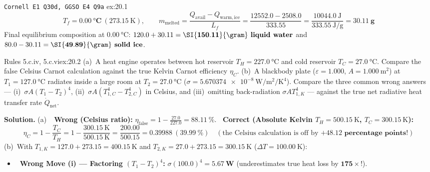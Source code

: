 \begin{workedexample}{\texttt{Cornell E1 Q30d, GGSO E4 Q9a} }{ex:20.1}
$$\boxed{T_f = \mathbf{\SI{0.00}{\celsius}}\ (\SI{273.15}{\kelvin})}, \qquad m_{\mathrm{melted}} = \frac{Q_{\mathrm{avail}} - Q_{\mathrm{warm,ice}}}{L_f} = \frac{12552.0 - 2508.0}{333.55} = \frac{\SI{10044.0}{\joule}}{\SI{333.55}{\joule\per\gram}} = \mathbf{\SI{30.11}{\gram}}$$
Final equilibrium composition at $\SI{0.00}{\celsius}$: $120.0 + 30.11 = \mathbf{\SI{150.11}{\gram}\text{\textbf{ liquid water}}}$ and $80.0 - 30.11 = \mathbf{\SI{49.89}{\gram}\text{\textbf{ solid ice}}}$.
\end{workedexample}

\begin{workedexample}{Rules 5.c.iv, 5.c.vi}{ex:20.2}
(a)~A heat engine operates between hot reservoir $T_H = \SI{227.0}{\celsius}$ and cold reservoir $T_C = \SI{27.0}{\celsius}$. Compare the false Celsius Carnot calculation against the true Kelvin Carnot efficiency $\eta_C$.
(b)~A blackbody plate ($\varepsilon = 1.000$, $A = \SI{1.000}{\square\meter}$) at $T_1 = \SI{127.0}{\celsius}$ radiates inside a large room at $T_2 = \SI{27.0}{\celsius}$ ($\sigma = \SI{5.670374e-8}{\watt\per\square\meter\per\kelvin\tothe{4}}$). Compare the three common wrong answers --- (i)~$\sigma A(T_1 - T_2)^4$, (ii)~$\sigma A(T_{1,C}^4 - T_{2,C}^4)$ in Celsius, and (iii)~omitting back-radiation $\sigma A T_{1,K}^4$ --- against the true net radiative heat transfer rate $\dot{Q}_{\mathrm{net}}$.
\par\smallskip\noindent
\textbf{Solution.}
(a)~\textbf{\xmark\ Wrong (Celsius ratio):} $\eta_{\mathrm{false}} = 1 - \frac{27.0}{227.0} = \SI{88.11}{\percent}$.
\textbf{\cmark\ Correct (Absolute Kelvin $T_H = \SI{500.15}{\kelvin}$, $T_C = \SI{300.15}{\kelvin}$):}
$$\eta_C = 1 - \frac{T_C}{T_H} = 1 - \frac{\SI{300.15}{\kelvin}}{\SI{500.15}{\kelvin}} = \frac{200.00}{500.15} = \mathbf{0.39988}\ (\mathbf{\SI{39.99}{\percent}}) \quad (\text{the Celsius calculation is off by }\mathbf{+48.12\text{ percentage points}}\text{!})$$
(b)~With $T_{1,K} = 127.0 + 273.15 = \SI{400.15}{\kelvin}$ and $T_{2,K} = 27.0 + 273.15 = \SI{300.15}{\kelvin}$ ($\Delta T = \SI{100.00}{\kelvin}$):
\begin{itemize}
  \item \textbf{\xmark\ Wrong Move (i) --- Factoring $(T_1 - T_2)^4$:} $\sigma(100.0)^4 = \mathbf{\SI{5.67}{\watt}}$ (underestimates true heat loss by $\mathbf{175\times}$!).

\end{itemize}
\end{workedexample}
